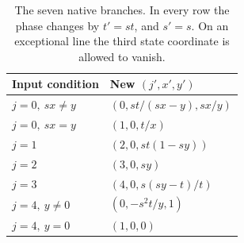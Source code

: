 \begin{table}[htbp]
\centering
\caption{The seven native branches. In every row the phase changes by
\(t'=st\), and \(s'=s\). On an exceptional line the third state
coordinate is allowed to vanish.}
\label{tab:native}
\begin{tabular}{@{}ll@{}}
\toprule
Input condition & New \((j',x',y')\) \\
\midrule
\(j=0,\ sx\ne y\) & \((0,st/(sx-y),sx/y)\) \\
\(j=0,\ sx=y\) & \((1,0,t/x)\) \\
\(j=1\) & \((2,0,st(1-sy))\) \\
\(j=2\) & \((3,0,sy)\) \\
\(j=3\) & \((4,0,s(sy-t)/t)\) \\
\(j=4,\ y\ne0\) & \((0,-s^2t/y,1)\) \\
\(j=4,\ y=0\) & \((1,0,0)\) \\
\bottomrule
\end{tabular}
\end{table}
